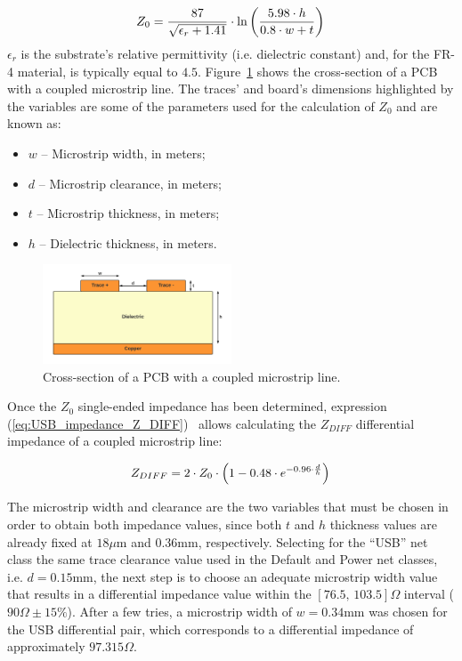 \begin{equation}\label{eq:USB_impedance_Z_0}
	Z_0 = \frac{87}{\sqrt{\epsilon_r + 1.41}} \cdot \ln \left(\frac{5.98 \cdot h}{0.8 \cdot w + t}\right)\,\medskip
\end{equation}
$\epsilon_r$ is the substrate's relative permittivity (i.e. dielectric constant) and, for the FR-4 material, is typically equal to $4.5$.
Figure~\ref{fig:USB_differential_pair} shows the cross-section of a PCB with a coupled microstrip line. The traces' and board's dimensions highlighted by the variables are some of the parameters used for the calculation of $Z_0$ and are known as:
\begin{itemize}
	\item $w$ -- Microstrip width, in meters;
	
	\item $d$ -- Microstrip clearance, in meters;
	
	\item $t$ -- Microstrip thickness, in meters;
	
	\item $h$ -- Dielectric thickness, in meters.
\end{itemize}

\begin{figure}[h]
    \centering
    \includegraphics[width=0.5\textwidth]{Chapters/Figures/chapter5/USB_differential_pair.pdf}
    \caption{Cross-section of a PCB with a coupled microstrip line.}
    \label{fig:USB_differential_pair}
\end{figure}

Once the $Z_0$ single-ended impedance has been determined, expression (\ref{eq:USB_impedance_Z_DIFF})~\cite{USB_Routing} allows calculating the $Z_{DIFF}$ differential impedance of a coupled microstrip line:

\begin{equation}\label{eq:USB_impedance_Z_DIFF}
	Z_{DIFF} = 2 \cdot Z_0 \cdot \left(1 - 0.48 \cdot e^{-0.96 \cdot \frac{d}{h}}\right)\,\medskip
\end{equation}

\noindent The microstrip width and clearance are the two variables that must be chosen in order to obtain both impedance values, since both $t$ and $h$ thickness values are already fixed at $18 \mu$m and $0.36$mm, respectively. Selecting for the ``USB'' net class the same trace clearance value used in the Default and Power net classes, i.e. $d=0.15$mm, the next step is to choose an adequate microstrip width value that results in a differential impedance value within the $[76.5,\, 103.5]\Omega$ interval ($90\Omega \pm 15\%$). After a few tries, a microstrip width of $w=0.34$mm was chosen for the USB differential pair, which corresponds to a differential impedance of approximately $97.315 \Omega$.

